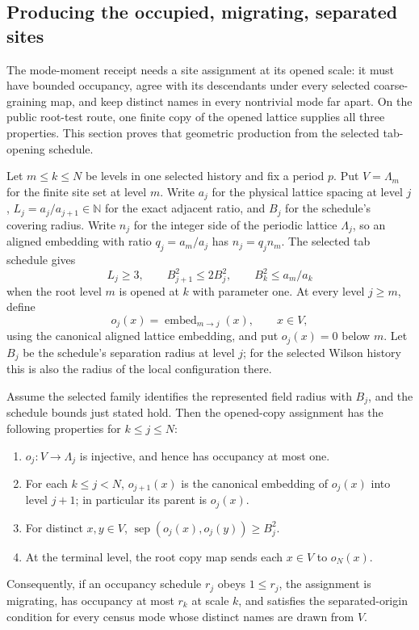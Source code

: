 \subsection{Producing the occupied, migrating, separated sites}\label{ex-centered-site-geometry}

The mode-moment receipt needs a site assignment at its opened scale: it must have bounded occupancy, agree with its descendants under every selected coarse-graining map, and keep distinct names in every nontrivial mode far apart. On the public root-test route, one finite copy of the opened lattice supplies all three properties. This section proves that geometric production from the selected tab-opening schedule.

Let $m\leq k\leq N$ be levels in one selected history and fix a period $p$. Put $V=\Lambda_m$ for the finite site set at level $m$. Write $a_j$ for the physical lattice spacing at level $j$, $L_j=a_j/a_{j+1}\in\mathbb N$ for the exact adjacent ratio, and $B_j$ for the schedule's covering radius. Write $n_j$ for the integer side of the periodic lattice $\Lambda_j$, so an aligned embedding with ratio $q_j=a_m/a_j$ has $n_j=q_jn_m$. The selected tab schedule gives
\[
 L_j\geq3,\qquad B_{j+1}^2\leq2B_j^2,
 \qquad B_k^2\leq a_m/a_k
\]
when the root level $m$ is opened at $k$ with parameter one. At every level $j\geq m$, define
\[
 o_j(x)=\operatorname{embed}_{m\to j}(x),\qquad x\in V,
\]
using the canonical aligned lattice embedding, and put $o_j(x)=0$ below $m$. Let $B_j$ be the schedule's separation radius at level $j$; for the selected Wilson history this is also the radius of the local configuration there.

\begin{lemma}\label{lem:ex-centered-opened-copy}
Assume the selected family identifies the represented field radius with $B_j$, and the schedule bounds just stated hold. Then the opened-copy assignment has the following properties for $k\leq j\leq N$:
\begin{enumerate}
\item $o_j:V\to\Lambda_j$ is injective, and hence has occupancy at most one.
\item For each $k\leq j<N$, $o_{j+1}(x)$ is the canonical embedding of $o_j(x)$ into level $j+1$; in particular its parent is $o_j(x)$.
\item For distinct $x,y\in V$, $\operatorname{sep}(o_j(x),o_j(y))\geq B_j^2$.
\item At the terminal level, the root copy map sends each $x\in V$ to $o_N(x)$.
\end{enumerate}
Consequently, if an occupancy schedule $r_j$ obeys $1\leq r_j$, the assignment is migrating, has occupancy at most $r_k$ at scale $k$, and satisfies the separated-origin condition for every census mode whose distinct names are drawn from $V$.
\end{lemma}

